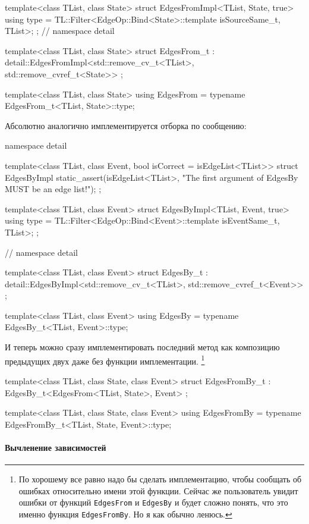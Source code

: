 \documentclass{article}
\begin{document}
{\begin{cppcode}[\nonumbers]
{template<class TList, class State>
struct EdgesFromImpl<TList, State, true> {
  using type = TL::Filter<EdgeOp::Bind<State>::template isSourceSame_t, TList>;
};
} // namespace detail

template<class TList, class State>
struct EdgesFrom_t : detail::EdgesFromImpl<std::remove_cv_t<TList>,
                                           std::remove_cvref_t<State>> {};

template<class TList, class State>
using EdgesFrom = typename EdgesFrom_t<TList, State>::type;
\end{cppcode}
Абсолютно аналогично имплементируется отборка по сообщению:
\begin{cppcode}[\nonumbers]
namespace detail {
template<class TList, class Event, bool isCorrect = isEdgeList<TList>>
struct EdgesByImpl {
  static_assert(isEdgeList<TList>, "The first argument of EdgesBy MUST be an edge list!");
};

template<class TList, class Event>
struct EdgesByImpl<TList, Event, true> {
  using type = TL::Filter<EdgeOp::Bind<Event>::template isEventSame_t, TList>;
};
} // namespace detail

template<class TList, class Event>
struct EdgesBy_t
    : detail::EdgesByImpl<std::remove_cv_t<TList>, std::remove_cvref_t<Event>> {
};

template<class TList, class Event>
using EdgesBy = typename EdgesBy_t<TList, Event>::type;
\end{cppcode}
И теперь можно сразу имплементировать последний метод как композицию предыдущих двух даже без функции имплементации.%
\footnote{По хорошему все равно надо бы сделать имплементацию, чтобы сообщать об ошибках относительно имени этой функции.
Сейчас же пользователь увидит ошибки от функций \texttt{EdgesFrom} и \texttt{EdgesBy} и будет сложно понять, что это именно функция \texttt{EdgesFromBy}.
Но я как обычно ленюсь.}
\begin{cppcode}[\nonumbers]
template<class TList, class State, class Event>
struct EdgesFromBy_t : EdgesBy_t<EdgesFrom<TList, State>, Event> {};

template<class TList, class State, class Event>
using EdgesFromBy = typename EdgesFromBy_t<TList, State, Event>::type;
\end{cppcode}

\paragraph{Вычленение зависимостей}

}
\end{document}
